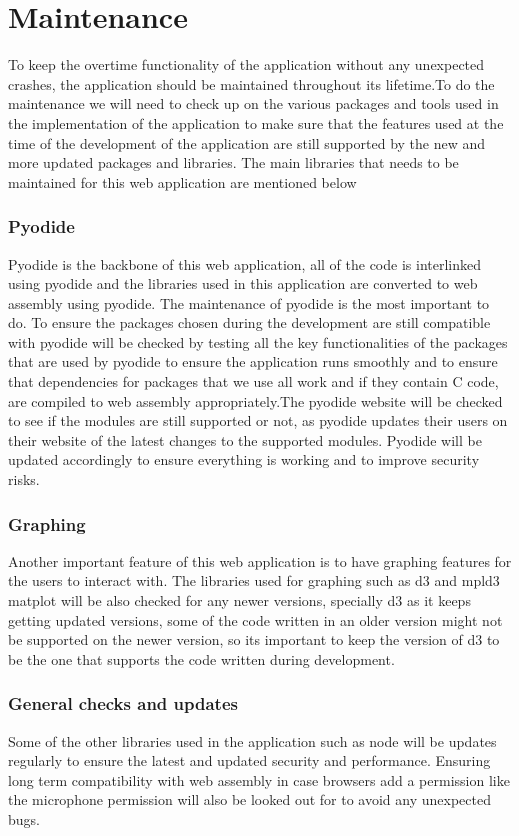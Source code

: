 \section{Maintenance}


To keep the overtime functionality of the application without any unexpected crashes, the application should be maintained throughout its lifetime.To do the maintenance we will need to check up on the various packages and tools used in the implementation of the application to make sure that the features used at the time of the development of the application are still supported by the new and more updated packages and libraries. The main libraries that needs to be maintained for this web application are mentioned below
\subsubsection{Pyodide}

Pyodide is the backbone of this web application, all of the code is interlinked using pyodide and the libraries used in this application are converted to web assembly using pyodide. The maintenance of pyodide is the most important to do. To ensure the packages chosen during the development are still compatible with pyodide will be checked by testing all the key functionalities of the packages that are used by pyodide to ensure the application runs smoothly and to ensure that dependencies for packages that we use all work and if they contain C code, are compiled to web assembly appropriately.The pyodide website will be checked to see if the modules are still supported or not, as pyodide updates their users on their website of the latest changes to the supported modules. Pyodide will be updated accordingly to ensure everything is working and to improve security risks.
\subsubsection{Graphing}
Another important feature of this web application is to have graphing features for the users to interact with. The libraries used for graphing such as d3 and  mpld3 matplot will be also checked for any newer versions, specially d3 as it keeps getting updated versions, some of the code written in an older version might not be supported on the newer version, so its important to keep the version of d3 to be the one that supports the code written during development.
\subsubsection{General checks and updates}
Some of the other libraries used in the application such as node will be updates regularly to ensure the latest and updated security and performance. Ensuring long term compatibility with web assembly in case browsers add a permission like the microphone permission will also be looked out for to avoid any unexpected bugs.